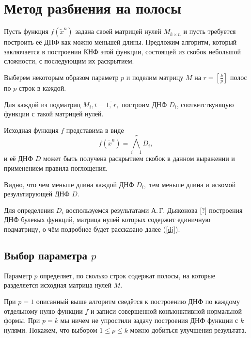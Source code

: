 \documentclass[12pt,a4paper,oneside,fleqn,leqno]{article}
\theoremstyle{definition}
\begin{document}
	\section{Метод разбиения на полосы}
		Пусть функция $f(\tilde x^n)$ задана своей матрицей нулей $M_{k \times n}$ и пусть требуется построить её ДНФ как можно меньшей длины. Предложим алгоритм, который заключается в построении КНФ этой функции, состоящей из скобок небольшой сложности, с последующим их раскрытием.\par
		Выберем некоторым образом параметр $p$ и поделим матрицу $M$ на $r = \left[\frac{k}{p}\right]$ полос по $p$ строк в каждой.\par
		Для каждой из подматриц $M_i, i = \overline{1,\,r},$ построим ДНФ $D_i$, соответствующую функции с такой матрицей нулей.\par
		Исходная функция $f$ представима в виде
		$$
			f(\tilde x^n) = \bigwedge_{i = 1}^r D_i,
		$$
		и её ДНФ $D$ может быть получена раскрытием скобок в данном выражении и применением правила поглощения.\par
		Видно, что чем меньше длина каждой ДНФ $D_i,$ тем меньше длина и искомой результирующей ДНФ $D.$\par
		Для определения $D_i$ воспользуемся результатами А.\,Г. Дьяконова [?] построения ДНФ булевых функций, матрица нулей которых содержит единичную подматрицу, о чём подробнее будет рассказано далее (\ref{dj}).
		\subsection{Выбор параметра $p$}
			Параметр $p$ определяет, по сколько строк содержат полосы, на которые разделяется исходная матрица нулей $M.$\par
			При $p = 1$ описанный выше алгоритм сведётся к построению ДНФ по каждому отдельному нулю функции $f$ и записи совершенной конъюнктивной нормальной формы. При $p = k$ мы ничем не упростили задачу построения ДНФ функции с $k$ нулями. Покажем, что выбором $1 \leqslant p \leqslant k$ можно добиться улучшения результата.\par
\end{document}
